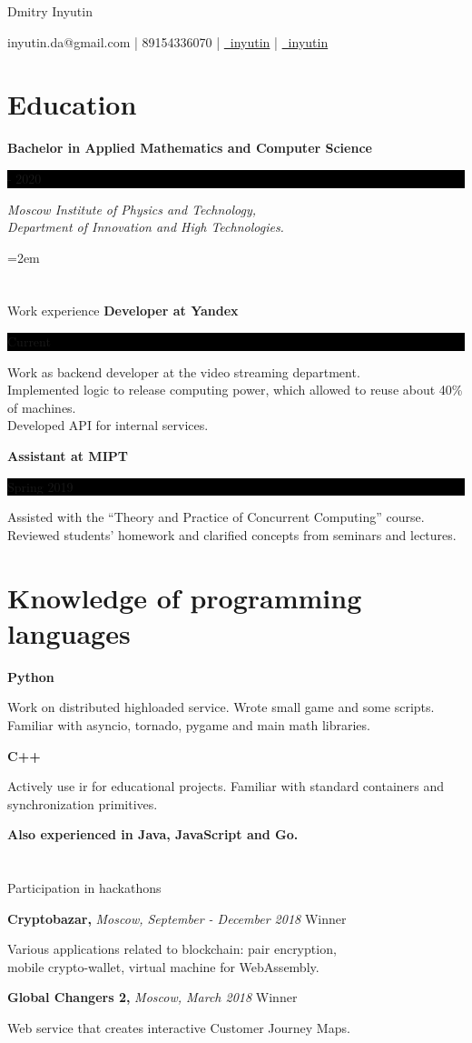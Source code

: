 \documentclass[fontsize=11pt]{article}
\newcommand{\sepspace}{\vspace*{1em}}   %
\newcommand{\MyName}[1]{ %
    \Huge \centering #1
    \par \normalsize \normalfont}
\newcommand{\NewPart}[1]{\section*{#1}}
\newcommand{\ProgrammingEntry}[2]{
    \noindent \textbf{#1} \hfill      %

    \noindent \small #2 %
    \normalsize \par}
\newcommand{\EducationEntry}[4]{
    \noindent \textbf{#1} \hfill      %
    \colorbox{Black}{
      \parbox{10em}{
      \color{White} \centering #2}} \par   %
    \noindent \textit{#3} \par        %
    \noindent\hangindent=2em\hangafter=0 \small #4 %
    \normalsize \par}
\newcommand{\WorkEntry}[3]{       %
    \noindent \large \textbf{#1} \hfill      %
    \colorbox{Black}{%
      \parbox{10em}{%
      \color{White} \centering #2}} \par  %
    \noindent \small #3 %
    \normalsize \par}
\newcommand{\AwardEntry}[4]{         %
    \noindent \textbf{#1} \noindent \textit{#3} \hfill {#2} \par
    \noindent \small #4 %
    \normalsize \par}
\begin{document}
\begin{minipage}{17cm}\raggedright
\MyName{Dmitry Inyutin}
{inyutin.da@gmail.com | 89154336070 | \href{https://t.me/inyutin}{\faTelegram \, inyutin} | \href{https://github.com/inyutin}{\faGithub \, inyutin}}
\end{minipage}



\NewPart{Education}{}
\EducationEntry
{Bachelor in Applied Mathematics and Computer Science}
{2016 - 2020}
{Moscow Institute of Physics and Technology, \\
 Department of Innovation and High Technologies.}

\NewPart{Work experience}{}
\WorkEntry
{Developer at Yandex}
{Current}
{Work as backend developer at the video streaming department.\\  Implemented logic to release computing power, which allowed to reuse about 40\% of machines. \\ Developed API for internal services. }

\bigskip

\WorkEntry
{Assistant at MIPT}
{Spring 2019}
{Assisted with the “Theory and Practice of Concurrent Computing” course. \\
 Reviewed students’ homework and clarified concepts from seminars and lectures.}

\NewPart{Knowledge of programming languages}{}
\ProgrammingEntry
{\textbf Python}
{Work on distributed highloaded service.
Wrote small game and some scripts. \\ Familiar with asyncio, tornado, pygame and main math libraries.}
\bigskip
\ProgrammingEntry
{C++}
{Actively use ir for educational projects. Familiar with standard containers and synchronization primitives.}
\bigskip

\ProgrammingEntry
{Also experienced in Java, JavaScript and Go.}

\NewPart{Participation in hackathons}{}

\AwardEntry{Cryptobazar, }{Winner}
{Moscow, September - December 2018}
{Various applications related to blockchain: pair encryption, \\ mobile crypto-wallet, virtual machine for WebAssembly.}
\sepspace
\AwardEntry{Global Changers 2,}{Winner}
{Moscow, March 2018}
{Web service that creates interactive Customer Journey Maps.}
\end{document}
